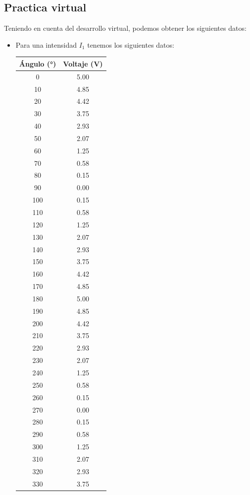 \documentclass{article}
\begin{document}
\begin{multicols}{2}
	\subsection*{Practica virtual}
	Teniendo en cuenta del desarrollo virtual, podemos obtener los siguientes datos:
	\begin{itemize}
		\item Para una intensidad $I_1$ tenemos los siguientes datos:
		\begin{table}[h]
		\centering
		\begin{tabular}{cc}
			\toprule
			\textbf{Ángulo (°)} & \textbf{Voltaje (V)} \\
			\midrule
			0   & 5.00 \\
			10  & 4.85 \\
			20  & 4.42 \\
			30  & 3.75 \\
			40  & 2.93 \\
			50  & 2.07 \\
			60  & 1.25 \\
			70  & 0.58 \\
			80  & 0.15 \\
			90  & 0.00 \\
			100 & 0.15 \\
			110 & 0.58 \\
			120 & 1.25 \\
			130 & 2.07 \\
			140 & 2.93 \\
			150 & 3.75 \\
			160 & 4.42 \\
			170 & 4.85 \\
			180 & 5.00 \\
			190 & 4.85 \\
			200 & 4.42 \\
			210 & 3.75 \\
			220 & 2.93 \\
			230 & 2.07 \\
			240 & 1.25 \\
			250 & 0.58 \\
			260 & 0.15 \\
			270 & 0.00 \\
			280 & 0.15 \\
			290 & 0.58 \\
			300 & 1.25 \\
			310 & 2.07 \\
			320 & 2.93 \\
			330 & 3.75 \\

\end{tabular}
\end{table}
\end{itemize}
\end{multicols}
\end{document}

